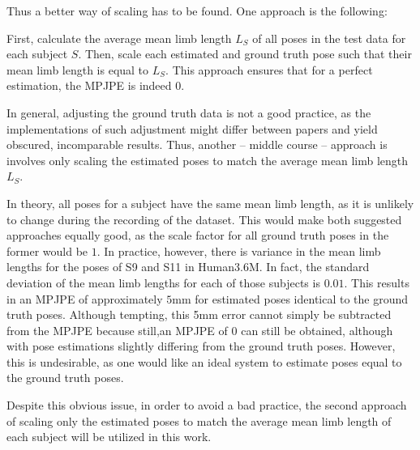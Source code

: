 Thus a better way of scaling has to be found.
One approach is the following:

First, calculate the average mean limb length $L_S$ of all poses in the test data for each subject $S$.
Then, scale each estimated and ground truth pose such that their mean limb length is equal to $L_S$.
This approach ensures that for a perfect estimation, the MPJPE is indeed 0.

In general, adjusting the ground truth data is not a good practice, as the implementations of such adjustment might differ between papers and yield obscured, incomparable results.
Thus, another -- middle course -- approach is involves only scaling the estimated poses to match the average mean limb length $L_S$.

In theory, all poses for a subject have the same mean limb length, as it is unlikely to change during the recording of the dataset.
This would make both suggested approaches equally good, as the scale factor for all ground truth poses in the former would be $1$.
In practice, however, there is variance in the mean limb lengths for the poses of S9 and S11 in Human3.6M.
In fact, the standard deviation of the mean limb lengths for each of those subjects is $0.01$.
This results in an MPJPE of approximately $5$mm for estimated poses identical to the ground truth poses.
Although tempting, this 5mm error cannot simply be subtracted from the MPJPE because still,an MPJPE of 0 can still be obtained, although with pose estimations slightly differing from the ground truth poses.
However, this is undesirable, as one would like an ideal system to estimate poses equal to the ground truth poses.

Despite this obvious issue, in order to avoid a bad practice, the second approach of scaling only the estimated poses to match the average mean limb length of each subject will be utilized in this work.

